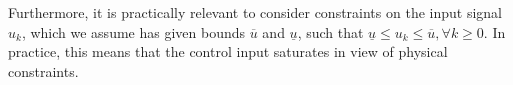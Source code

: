 \documentclass[runningheads,a4paper]{llncs}
\newcommand{\addtodo}[1]{{\color{red} TODO: #1}}
\newcommand{\commentib}[1]{{\color{blue} [IB: #1]}}
\newcommand{\mat}[1]{\boldsymbol{#1}}
\begin{document}
Furthermore, 
it is practically relevant to consider constraints on the input signal $u_{k}$, 
which we assume has given bounds $\overline{u}$ and $\underline{u}$, 
such that ${\underline{u} \leq u_{k} \leq \overline{u}},\forall k\geq 0$.  
In practice, 
this means that the control input saturates in view of physical constraints. 




\end{document}
